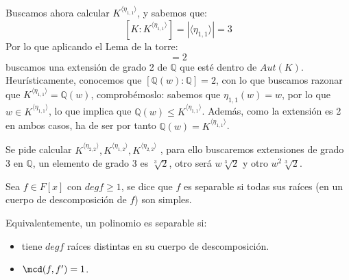 \begin{ejemplo}
    \noindent
    Buscamos ahora calcular $K^{\langle \eta_{1,1} \rangle }$, y sabemos que:
    \begin{equation*}
        \left[K:K^{\langle \eta_{1,1} \rangle }\right] = |\langle \eta_{1,1} \rangle | = 3
    \end{equation*}
    Por lo que aplicando el Lema de la torre:
    \begin{equation*}
        [K^{\eta_{1,1}}:\mathbb{Q}] = 2
    \end{equation*}
    buscamos una extensión de grado 2 de $\mathbb{Q}$ que esté dentro de $Aut(K)$. Heurísticamente, conocemos que $[\mathbb{Q}(w):\mathbb{Q}] = 2$, con lo que buscamos razonar que $K^{\langle \eta_{1,1} \rangle } = \mathbb{Q}(w)$, comprobémoslo: sabemos que $\eta_{1,1}(w) = w$, por lo que $w\in K^{\langle \eta_{1,1} \rangle }$, lo que implica que $\mathbb{Q}(w)\leq K^{\langle \eta_{1,1} \rangle }$. Además, como la extensión es 2 en ambos casos, ha de ser por tanto $\mathbb{Q}(w) = K^{\langle \eta_{1,1} \rangle }$.

    \noindent
    Se pide calcular $K^{\langle \eta_{2,2} \rangle }, K^{\langle \eta_{1,2} \rangle }, K^{\langle \eta_{2,2} \rangle }$ , para ello buscaremos extensiones de grado 3 en $\mathbb{Q}$, un elemento de grado 3 es $\sqrt[3]{2}$, otro será $w\sqrt[3]{2}$ y otro $w^2\sqrt[3]{2}$.
\end{ejemplo}

\begin{definicion}
    Sea $f\in F[x]$ con $degf \geq 1$, se dice que $f$ es separable si todas sus raíces (en un cuerpo de descomposición de $f$) son simples.
\end{definicion}

\begin{observacion}
    Equivalentemente, un polinomio es separable si: 
    \begin{itemize}
        \item tiene $degf$ raíces distintas en su cuerpo de descomposición.
        \item $\mcd (f,f') = 1$.
    \end{itemize}
\end{observacion}

